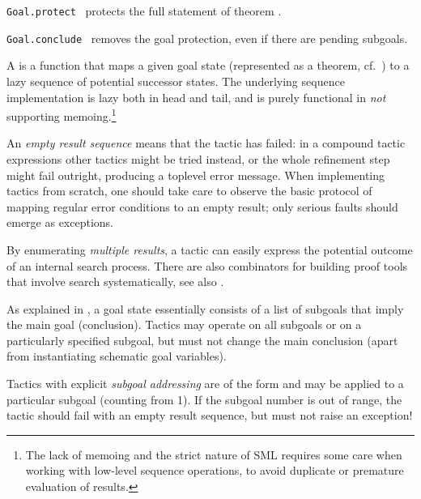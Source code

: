 \begin{isabellebody}
\begin{isamarkuptext}
\begin{description}
  \item \verb|Goal.protect|~ protects the full statement
  of theorem .

  \item \verb|Goal.conclude|~ removes the goal
  protection, even if there are pending subgoals.

  \end{description}%
\end{isamarkuptext}%
\isamarkuptrue%
%
\endisatagmlref
{\isafoldmlref}%
%
\isadelimmlref
%
\endisadelimmlref
%
\isamarkuptrue%
%
\begin{isamarkuptext}%
A  is a function  that
  maps a given goal state (represented as a theorem, cf.\
  ) to a lazy sequence of potential
  successor states.  The underlying sequence implementation is lazy
  both in head and tail, and is purely functional in \emph{not}
  supporting memoing.\footnote{The lack of memoing and the strict
  nature of SML requires some care when working with low-level
  sequence operations, to avoid duplicate or premature evaluation of
  results.}

  An \emph{empty result sequence} means that the tactic has failed: in
  a compound tactic expressions other tactics might be tried instead,
  or the whole refinement step might fail outright, producing a
  toplevel error message.  When implementing tactics from scratch, one
  should take care to observe the basic protocol of mapping regular
  error conditions to an empty result; only serious faults should
  emerge as exceptions.

  By enumerating \emph{multiple results}, a tactic can easily express
  the potential outcome of an internal search process.  There are also
  combinators for building proof tools that involve search
  systematically, see also .

  \medskip As explained in , a goal state
  essentially consists of a list of subgoals that imply the main goal
  (conclusion).  Tactics may operate on all subgoals or on a
  particularly specified subgoal, but must not change the main
  conclusion (apart from instantiating schematic goal variables).

  Tactics with explicit \emph{subgoal addressing} are of the form
  \isa{int\ {\isasymrightarrow}\ tactic} and may be applied to a particular subgoal
  (counting from 1).  If the subgoal number is out of range, the
  tactic should fail with an empty result sequence, but must not raise
  an exception!


\end{isamarkuptext}
\end{isabellebody}
